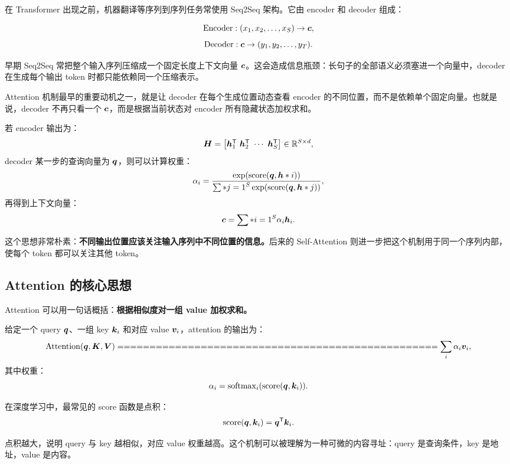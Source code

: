 在 Transformer 出现之前，机器翻译等序列到序列任务常使用 Seq2Seq 架构。它由 encoder 和 decoder 组成：

\[
\text{Encoder}: (x_1,x_2,\ldots,x_S)\rightarrow \bm{c},
\]
\[
\text{Decoder}: \bm{c}\rightarrow (y_1,y_2,\ldots,y_T).
\]

早期 Seq2Seq 常把整个输入序列压缩成一个固定长度上下文向量 $\bm{c}$。这会造成信息瓶颈：长句子的全部语义必须塞进一个向量中，decoder 在生成每个输出 token 时都只能依赖同一个压缩表示。

Attention 机制最早的重要动机之一，就是让 decoder 在每个生成位置动态查看 encoder 的不同位置，而不是依赖单个固定向量。也就是说，decoder 不再只看一个 $\bm{c}$，而是根据当前状态对 encoder 所有隐藏状态加权求和。

若 encoder 输出为：
\[
\bm{H}=
\begin{bmatrix}
\bm{h}_1^{\mathsf{T}}\
\bm{h}_2^{\mathsf{T}}\
\cdots\
\bm{h}_S^{\mathsf{T}}
\end{bmatrix}
\in\mathbb{R}^{S\times d},
\]
decoder 某一步的查询向量为 $\bm{q}$，则可以计算权重：
\[
\alpha_i=
\frac{\exp(\operatorname{score}(\bm{q},\bm{h}*i))}
{\sum*{j=1}^{S}\exp(\operatorname{score}(\bm{q},\bm{h}*j))},
\]
再得到上下文向量：
\[
\bm{c}=\sum*{i=1}^{S}\alpha_i\bm{h}_i.
\]

这个思想非常朴素：\textbf{不同输出位置应该关注输入序列中不同位置的信息。}后来的 Self-Attention 则进一步把这个机制用于同一个序列内部，使每个 token 都可以关注其他 token。

\subsection{Attention 的核心思想}
\label{subsec:attention-core-idea}

Attention 可以用一句话概括：\textbf{根据相似度对一组 value 加权求和。}

给定一个 query $\bm{q}$、一组 key ${\bm{k}_i}$ 和对应 value ${\bm{v}_i}$，attention 的输出为：
\[
\operatorname{Attention}(\vect{q},\mat{K},\mat{V})
==================================================

\sum_i \alpha_i\vect{v}_i,
\]
其中权重：
\[
\alpha_i=
\operatorname{softmax}_i(\operatorname{score}(\bm{q},\bm{k}_i)).
\]

在深度学习中，最常见的 score 函数是点积：
\[
\operatorname{score}(\bm{q},\bm{k}_i)=\bm{q}^{\mathsf{T}}\bm{k}_i.
\]

点积越大，说明 query 与 key 越相似，对应 value 权重越高。这个机制可以被理解为一种可微的内容寻址：query 是查询条件，key 是地址，value 是内容。

